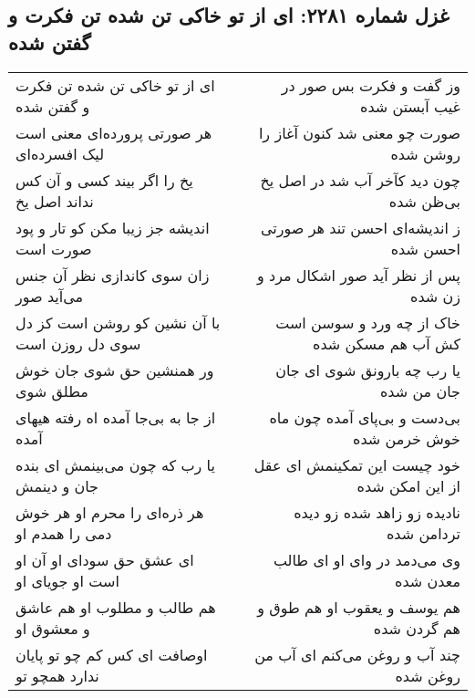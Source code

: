 \begin{center}
\section*{غزل شماره ۲۲۸۱: ای از تو خاکی تن شده تن فکرت و گفتن شده}
\label{sec:2281}
\begin{longtable}{l p{0.5cm} r}
ای از تو خاکی تن شده تن فکرت و گفتن شده
&&
وز گفت و فکرت بس صور در غیب آبستن شده
\\
هر صورتی پرورده‌ای معنی است لیک افسرده‌ای
&&
صورت چو معنی شد کنون آغاز را روشن شده
\\
یخ را اگر بیند کسی و آن کس نداند اصل یخ
&&
چون دید کآخر آب شد در اصل یخ بی‌ظن شده
\\
اندیشه جز زیبا مکن کو تار و پود صورت است
&&
ز اندیشه‌ای احسن تند هر صورتی احسن شده
\\
زان سوی کاندازی نظر آن جنس می‌آید صور
&&
پس از نظر آید صور اشکال مرد و زن شده
\\
با آن نشین کو روشن است کز دل سوی دل روزن است
&&
خاک از چه ورد و سوسن است کش آب هم مسکن شده
\\
ور همنشین حق شوی جان خوش مطلق شوی
&&
یا رب چه بارونق شوی ای جان جان من شده
\\
از جا به بی‌جا آمده اه رفته هیهای آمده
&&
بی‌دست و بی‌پای آمده چون ماه خوش خرمن شده
\\
یا رب که چون می‌بینمش ای بنده جان و دینمش
&&
خود چیست این تمکینمش ای عقل از این امکن شده
\\
هر ذره‌ای را محرم او هر خوش دمی را همدم او
&&
نادیده زو زاهد شده زو دیده تردامن شده
\\
ای عشق حق سودای او آن او است او جویای او
&&
وی می‌دمد در وای او ای طالب معدن شده
\\
هم طالب و مطلوب او هم عاشق و معشوق او
&&
هم یوسف و یعقوب او هم طوق و هم گردن شده
\\
اوصافت ای کس کم چو تو پایان ندارد همچو تو
&&
چند آب و روغن می‌کنم ای آب من روغن شده
\\
\end{longtable}
\end{center}
